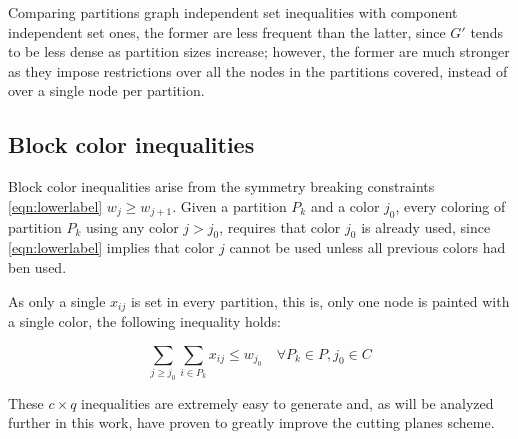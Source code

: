 Comparing partitions graph independent set inequalities with component independent set ones, the former are less frequent than the latter, since $G'$ tends to be less dense as partition sizes increase; however, the former are much stronger as they impose restrictions over all the nodes in the partitions covered, instead of over a single node per partition.

\subsection{Block color inequalities}

Block color inequalities arise from the symmetry breaking constraints \ref{eqn:lowerlabel} $w_j \geq w_{j+1}$. Given a partition $P_k$ and a color $j_0$, every coloring of partition $P_k$ using any color $j > j_0$, requires that color $j_0$ is already used, since \ref{eqn:lowerlabel} implies that color $j$ cannot be used unless all previous colors had ben used. 

As only a single $x_{ij}$ is set in every partition, this is, only one node is painted with a single color, the following inequality holds:

\begin{equation}
\label{ineq:blockcp}
\sum_{j \geq j_0} \sum_{i \in P_k} x_{ij} \leq w_{j_0} \quad \forall P_k \in P, j_0 \in C
\end{equation}

These $c \times q$ inequalities are extremely easy to generate and, as will be analyzed further in this work, have proven to greatly improve the cutting planes scheme.

